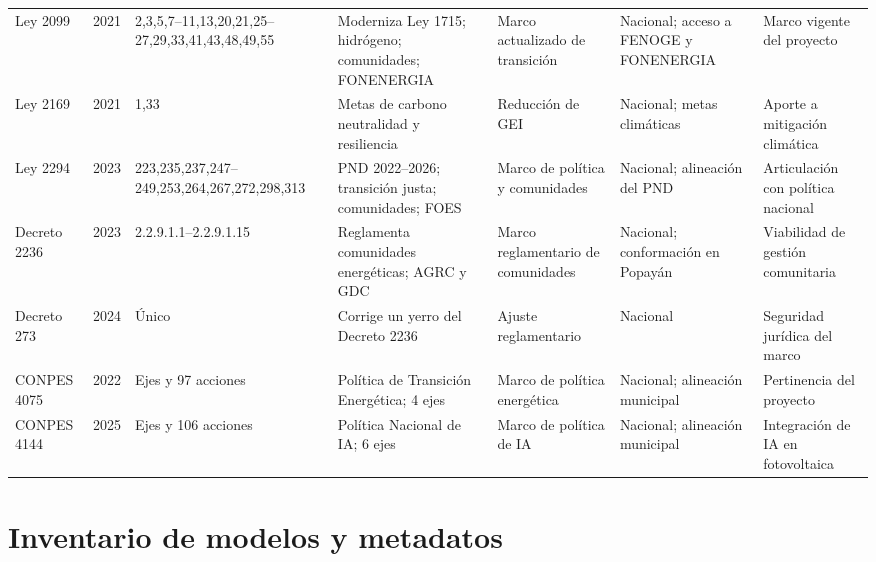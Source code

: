 \begin{table}[p]
\begin{tabular}{@{}p{}p{}p{}p{}p{}p{}p{}@{}}
Ley 2099 & 2021 & 2,3,5,7--11,13,20,21,25--27,29,33,41,43,48,49,55 & Moderniza Ley 1715; hidrógeno; comunidades; FONENERGIA & Marco actualizado de transición & Nacional; acceso a FENOGE y FONENERGIA & Marco vigente del proyecto \\
Ley 2169 & 2021 & 1,33 & Metas de carbono neutralidad y resiliencia & Reducción de GEI & Nacional; metas climáticas & Aporte a mitigación climática \\
Ley 2294 & 2023 & 223,235,237,247--249,253,264,267,272,298,313 & PND 2022--2026; transición justa; comunidades; FOES & Marco de política y comunidades & Nacional; alineación del PND & Articulación con política nacional \\
Decreto 2236 & 2023 & 2.2.9.1.1--2.2.9.1.15 & Reglamenta comunidades energéticas; AGRC y GDC & Marco reglamentario de comunidades & Nacional; conformación en Popayán & Viabilidad de gestión comunitaria \\
Decreto 273 & 2024 & Único & Corrige un yerro del Decreto 2236 & Ajuste reglamentario & Nacional & Seguridad jurídica del marco \\
CONPES 4075 & 2022 & Ejes y 97 acciones & Política de Transición Energética; 4 ejes & Marco de política energética & Nacional; alineación municipal & Pertinencia del proyecto \\
CONPES 4144 & 2025 & Ejes y 106 acciones & Política Nacional de IA; 6 ejes & Marco de política de IA & Nacional; alineación municipal & Integración de IA en fotovoltaica \\
\bottomrule
\end{tabular}
\end{table}
\section{Inventario de modelos y metadatos}
